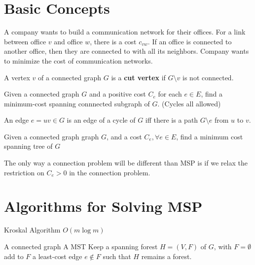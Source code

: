 		\section{Basic Concepts}
			\begin{example}
				A company wants to build a communication network for their offices. For a link between office $v$ and office $w$, there is a cost $c_{vw}$. If an office is connected to another office, then they are connected to with all its neighbors. Company wants to minimize the cost of communication networks.
			\end{example}

			\begin{definition}
				A vertex $v$ of a connected graph $G$ is a \textbf{cut vertex} if $G\setminus v$ is not connected.
			\end{definition}

			\begin{definition}
				Given a connected graph $G$ and a positive cost $C_e$ for each $e\in E$, find a minimum-cost spanning connnected subgraph of $G$. (Cycles all allowed)
			\end{definition}

			\begin{lemma}
				An edge $e = uv \in G$ is an edge of a cycle of $G$ iff there is a path $G\setminus e$ from $u$ to $v$.
			\end{lemma}

			\begin{definition}
				Given a connected graph graph $G$, and a cost $C_e, \forall e\in E$, find a minimum cost spanning tree of $G$
			\end{definition}

			The only way a connection problem will be different than MSP is if we relax the restriction on $C_e > 0$ in the connection problem.

		\section{Algorithms for Solving MSP}
			\begin{algorithm}
				\caption{Kroskal Algorithm $O(m \log m)$}
				\begin{algorithmic}
					\REQUIRE A connected graph
					\ENSURE A MST
					\STATE Keep a spanning forest $H=(V, F)$ of $G$, with $F=\emptyset$
						\STATE add to $F$ a least-cost edge $e\notin F$ such that $H$ remains a forest.
					\ENDWHILE
				\end{algorithmic}
			\end{algorithm}

